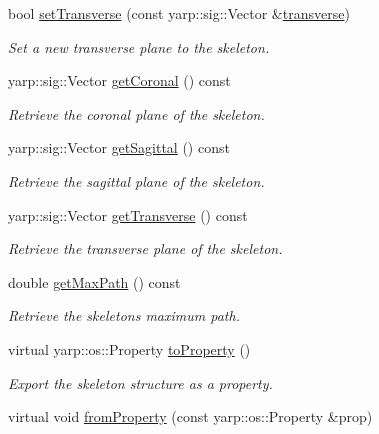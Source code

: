 \begin{DoxyCompactItemize}
bool \hyperlink{classassistive__rehab_1_1Skeleton_a1aeba05a17363afc08c30397d17375df}{set\+Transverse} (const yarp\+::sig\+::\+Vector \&\hyperlink{classassistive__rehab_1_1Skeleton_ab8a9bf9297f520e8de801248e0b8d2dd}{transverse})
\begin{DoxyCompactList}\small\item\em Set a new transverse plane to the skeleton. \end{DoxyCompactList}\item 
yarp\+::sig\+::\+Vector \hyperlink{classassistive__rehab_1_1Skeleton_aa241a0ac93a9ead198f985073c8935eb}{get\+Coronal} () const
\begin{DoxyCompactList}\small\item\em Retrieve the coronal plane of the skeleton. \end{DoxyCompactList}\item 
yarp\+::sig\+::\+Vector \hyperlink{classassistive__rehab_1_1Skeleton_a83133fabc903ddd4e54edf59df977167}{get\+Sagittal} () const
\begin{DoxyCompactList}\small\item\em Retrieve the sagittal plane of the skeleton. \end{DoxyCompactList}\item 
yarp\+::sig\+::\+Vector \hyperlink{classassistive__rehab_1_1Skeleton_a35c3cdea575eb474a2cb8e0186011cff}{get\+Transverse} () const
\begin{DoxyCompactList}\small\item\em Retrieve the transverse plane of the skeleton. \end{DoxyCompactList}\item 
double \hyperlink{classassistive__rehab_1_1Skeleton_acda9030cd2ed3ad92697418a5e2cff7c}{get\+Max\+Path} () const
\begin{DoxyCompactList}\small\item\em Retrieve the skeleton\textquotesingle{}s maximum path. \end{DoxyCompactList}\item 
virtual yarp\+::os\+::\+Property \hyperlink{classassistive__rehab_1_1Skeleton_ad58ea53a165abc3f39a3c46594f0560f}{to\+Property} ()
\begin{DoxyCompactList}\small\item\em Export the skeleton structure as a property. \end{DoxyCompactList}\item 
virtual void \hyperlink{classassistive__rehab_1_1Skeleton_ac844f66503de87859833056dc33a835b}{from\+Property} (const yarp\+::os\+::\+Property \&prop)

\end{DoxyCompactItemize}
